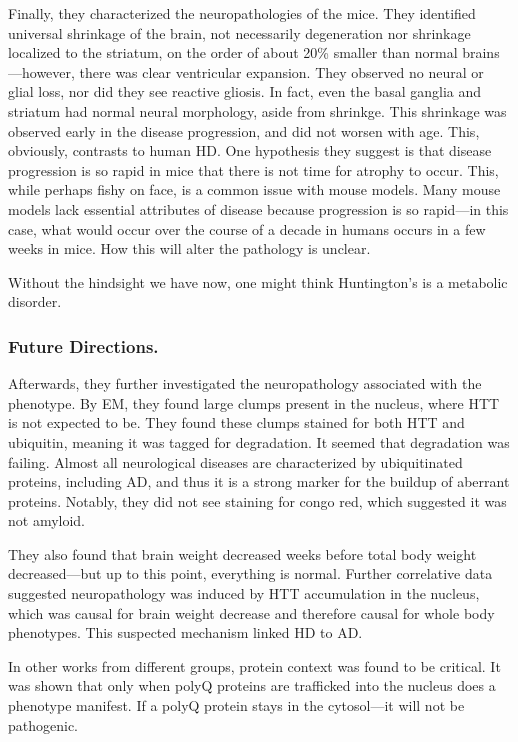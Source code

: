 Finally, they characterized the neuropathologies of the mice. They identified universal shrinkage of the brain, not necessarily degeneration nor shrinkage localized to the striatum, on the order of about 20\% smaller than normal brains---however, there was clear ventricular expansion. They observed no neural or glial loss, nor did they see reactive gliosis. In fact, even the basal ganglia and striatum had normal neural morphology, aside from shrinkge.  This shrinkage was observed early in the disease progression, and did not worsen with age. This, obviously, contrasts to human HD. One hypothesis they suggest is that disease progression is so rapid in mice that there is not time for atrophy to occur. This, while perhaps fishy on face, is a common issue with mouse models. Many mouse models lack essential attributes of disease because progression is so rapid---in this case, what would occur over the course of a decade in humans occurs in a few weeks in mice. How this will alter the pathology is unclear.\newline

Without the hindsight we have now, one might think Huntington's is a metabolic disorder. 

\subsubsection*{Future Directions.}
Afterwards, they further investigated the neuropathology associated with the phenotype. By EM, they found large clumps present in the nucleus, where HTT is not expected to be. They found these clumps stained for both HTT and ubiquitin, meaning it was tagged for degradation. It seemed that degradation was failing. Almost all neurological diseases are characterized by ubiquitinated proteins, including AD, and thus it is a strong marker for the buildup of aberrant proteins. Notably, they did not see staining for congo red, which suggested it was not amyloid. \newline

They also found that brain weight decreased weeks before total body weight decreased---but up to this point, everything is normal. Further correlative data suggested neuropathology was induced by HTT accumulation in the nucleus, which was causal for brain weight decrease and therefore causal for whole body phenotypes. This suspected mechanism linked HD to AD.\newline

In other works from different groups, protein context was found to be critical. It was shown that only when polyQ proteins are trafficked into the nucleus does a phenotype manifest. If a polyQ protein stays in the cytosol---it will not be pathogenic.

